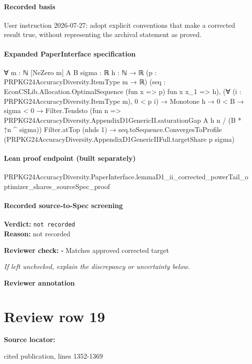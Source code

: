 \documentclass[10pt]{article}
\newcommand{\reviewerbox}{%
  \par\noindent\fbox{\parbox{0.96\linewidth}{\rule{0pt}{0.38in}}}\par
}
\newcommand{\reviewmatch}[1]{%
  \par\noindent\textbf{Reviewer check:} $\square$\; #1\par
  \noindent\emph{If left unchecked, explain the discrepancy or uncertainty below.}\par
}
\begin{document}
\paragraph{Recorded basis}
User instruction 2026-\allowbreak{}07-\allowbreak{}27:\allowbreak{} adopt explicit conventions that make a corrected result true, without representing the archival statement as proved.\allowbreak{}
\paragraph{Expanded PaperInterface specification}
\begin{ReviewVerbatim}
∀ {m : ℕ} [NeZero m] {A B sigma : ℝ} {h : ℕ → ℝ} (p : PRPKG24AccuracyDiversity.ItemType m → ℝ)
  (seq : EconCSLib.Allocation.OptimalSequence (fun x => p) fun x x_1 => h),
  (∀ (i : PRPKG24AccuracyDiversity.ItemType m), 0 < p i) →
    Monotone h →
      0 < B →
        sigma < 0 →
          Filter.Tendsto (fun n => PRPKG24AccuracyDiversity.AppendixD1GenericII.saturationGap A h n / (B * ↑n ^ sigma))
              Filter.atTop (nhds 1) →
            seq.toSequence.ConvergesToProfile (PRPKG24AccuracyDiversity.AppendixD1GenericIIFull.targetShare p sigma)
\end{ReviewVerbatim}

\paragraph{Lean proof endpoint (built separately)}\begin{ReviewVerbatim}
PRPKG24AccuracyDiversity.PaperInterface.lemmaD1_ii_corrected_powerTail_optimizer_shares_sourceSpec_proof
\end{ReviewVerbatim}

\paragraph{Recorded source-to-Spec screening}
\textbf{Verdict:} \texttt{not recorded}
\\
\textbf{Reason:} not recorded
\reviewmatch{Matches approved corrected target}
\noindent\textbf{Reviewer annotation}\par
\reviewerbox
\clearpage
\hypertarget{source-claim-3f921e813126282a}{}
\section*{Review row 19}
\textbf{Source locator:} {\footnotesize\raggedright cited publication, lines 1352-\allowbreak{}1369\par}
\end{document}
